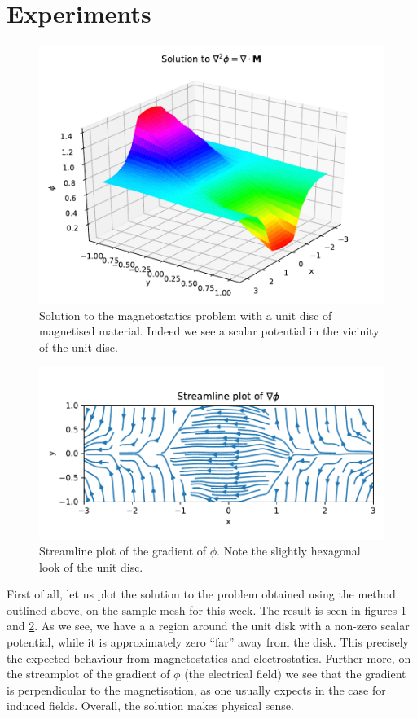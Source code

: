 \documentclass[sigconf]{acmart}
\begin{document}
\section{Experiments}
\begin{figure}
	\centering
	\includegraphics[width=\linewidth]{ex_simple.pdf}
	\caption{Solution to the magnetostatics problem with a unit disc of magnetised material. Indeed we see a scalar potential in the vicinity of the unit disc.}
	\label{fig:ex_simple}
\end{figure}
\begin{figure}
	\centering
	\includegraphics[width=\linewidth]{ex_streams.pdf}
	\caption{Streamline plot of the gradient of $ \phi $. Note the slightly hexagonal look of the unit disc.}
	\label{fig:ex_streams}
\end{figure}
First of all, let us plot the solution to the problem obtained using the method outlined above, on the sample mesh for this week. The result is seen in figures \ref{fig:ex_simple} and \ref{fig:ex_streams}. As we see, we have a a region around the unit disk with a non-zero scalar potential, while it is approximately zero ``far'' away from the disk. This precisely the expected behaviour from magnetostatics and electrostatics. Further more, on the streamplot of the gradient of $ \phi $ (the electrical field) we see that the gradient is perpendicular to the magnetisation, as one usually expects in the case for induced fields. Overall, the solution makes physical sense.
\end{document}
